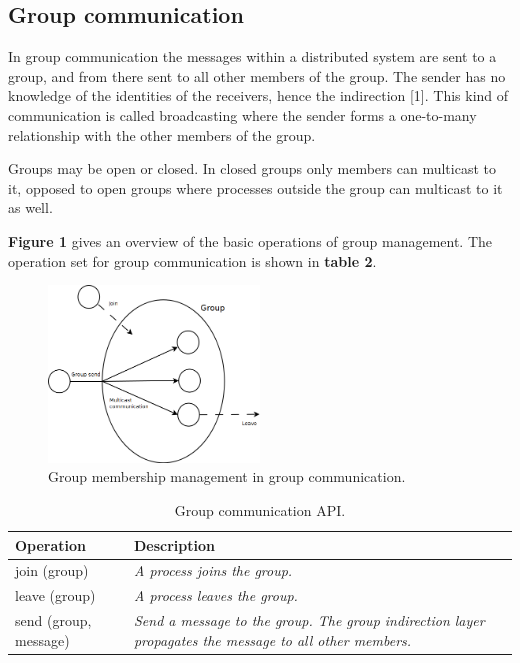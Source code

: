\subsection{Group communication}

In group communication the messages within a distributed system are sent to a group, and from there sent to all other members of the group. The sender has no knowledge of the identities of the receivers, hence the indirection [1]. This kind of communication is called broadcasting where the sender forms a one-to-many relationship with the other members of the group.

Groups may be open or closed. In closed groups only members can multicast to it, opposed to open groups where processes outside the group can multicast to it as well.

\textbf{Figure 1} gives an overview of the basic operations of group management. The operation set for group communication is shown in \textbf{table 2}.


\begin{figure}
	\begin{center}
		\includegraphics[width=0.5\textwidth]{img/groupcommunication}
	\end{center}
	\caption{Group membership management in group communication.}
	\label{fig:groupcommunication}
\end{figure}

\begin{table}
	\caption{Group communication API.}
	\label{tab:api:groupcommunication}
	\begin{tabular}{p{150px} | p{250px}}
		\textbf{Operation} & \textbf{Description} \\
		\hline
		join (group) & \emph{A process joins the group.} \\
		leave (group) & \emph{A process leaves the group.} \\
		send (group, message) & \emph{Send a message to the group. The group indirection layer propagates the message to all other members.} \\
		\hline
	\end{tabular}
\end{table}


